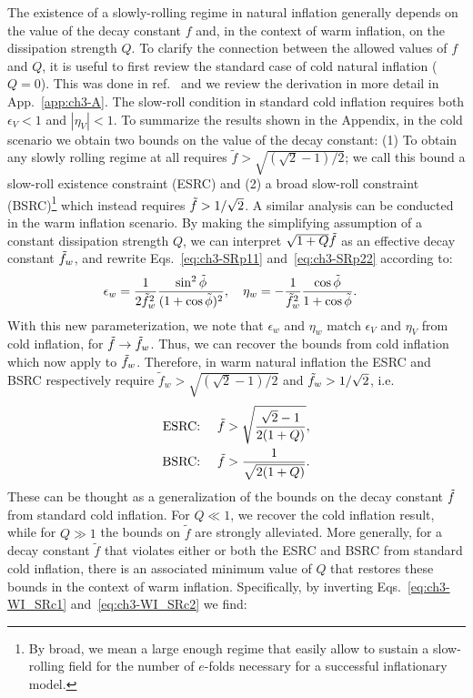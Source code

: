 The existence of a slowly-rolling regime in natural inflation generally depends on the value of the decay constant $f$ and, in the context of warm inflation, on the dissipation strength $Q$. To clarify the connection between the allowed values of $f$ and $Q$, it is useful to first review the standard case of cold natural inflation ($Q=0$). This was done in ref.~\cite{Freese:2004un} and we review the derivation in more detail in App.~\ref{app:ch3-A}.
The slow-roll condition in standard cold inflation requires  both $\epsilon_V < 1$ and $|\eta_V| < 1$.
To summarize the results shown in the Appendix, in the cold scenario we obtain two bounds on the value of the decay constant:
(1) To obtain any slowly rolling regime at all requires $\tilde{f}>\sqrt{(\sqrt{2}-1)/2}$; we call this bound a slow-roll existence constraint (ESRC) and (2) a broad slow-roll constraint (BSRC)\footnote{By broad, we mean a large enough regime that easily allow to sustain a slow-rolling field for the number of $e$-folds necessary for a successful inflationary model.} which instead requires $\Tilde{f}>1/\sqrt{2}$. A similar analysis can be conducted in the warm inflation scenario. By making the simplifying assumption of a constant dissipation strength $Q$, we can interpret $\sqrt{1+Q}\Tilde{f}$ as an effective decay constant $\Tilde{f}_w$, and rewrite Eqs.~\ref{eq:ch3-SRp11} and~\ref{eq:ch3-SRp22} according to:
\begin{align}
\epsilon_{w}&= \frac{1}{2\Tilde{f}_w^2}\frac{\sin ^{2} \Tilde{\phi}}{(1+\cos \Tilde{\phi})^{2}}, \quad
\eta_{w}=-\frac{1}{\Tilde{f}_w^2}  \frac{\cos\Tilde{\phi} }{1+\cos \Tilde{\phi}}.
\end{align}
With this new parameterization, we note that $\epsilon_w$ and $\eta_w$ match $\epsilon_V$ and $\eta_V$ from cold inflation, for $\Tilde{f} \to \Tilde{f}_w$. Thus, we can recover the bounds from cold inflation which now apply to $\Tilde{f}_w$. Therefore, in warm natural inflation
the ESRC and BSRC respectively require $\tilde{f}_w>\sqrt{(\sqrt{2}-1)/2}$ and $\Tilde{f}_w>1/\sqrt{2}$, i.e.
\begin{align}
    \text{ESRC: }\quad \Tilde{f}&>\sqrt{\frac{\sqrt{2}-1}{2(1+Q)}}, \label{eq:ch3-WI_SRc1}\\
    \text{BSRC: }\quad \Tilde{f}&>\frac{1}{\sqrt{2(1+Q)}}.  \label{eq:ch3-WI_SRc2}
\end{align}
These can be thought as a generalization of the bounds on the decay constant $\Tilde{f}$ from standard cold inflation. For $Q \ll 1$, we recover the cold inflation result, while for $Q\gg 1$ the bounds on $\tilde{f}$ are strongly alleviated. More generally, for a decay constant $\tilde{f}$ that violates either or both the ESRC and BSRC from standard cold inflation, there is an associated minimum value of $Q$ that restores these bounds in the context of warm inflation. Specifically, by inverting Eqs.~\ref{eq:ch3-WI_SRc1} and~\ref{eq:ch3-WI_SRc2} we find:
